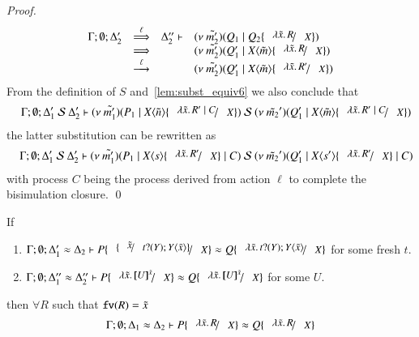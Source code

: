 \begin{proof}
%
\[
	\begin{array}{rcll}
		\Gamma; \es; \Delta_2' &\By{\ell}& \Delta_2'' \proves &
		\newsp{\tilde{m_2'}}{Q_1 \Par Q_2 \subst{\abs{\tilde{x}}{R}}{X}}\\
		&\By{}& &
		\newsp{\tilde{m_2'}}{Q_1' \Par \appl{X}{\tilde{m}} \subst{\abs{\tilde{x}}{R}}{X}} \\
		&\by{\ell}& &
		\newsp{\tilde{m_2'}}{Q_1' \Par \appl{X}{\tilde{m}} \subst{\abs{\tilde{x}}{R'}}{X}} \\
	\end{array}
\]
%
	\noi From the definition of $S$ and~\ref{lem:subst_equiv6}
	we also conclude that
	\begin{eqnarray*}
		&& \horel{\Gamma}
		{\Delta_1'}{\newsp{\tilde{m_1'}}{P_1 \Par \appl{X}{\tilde{n}} \subst{\abs{\tilde{x}}{R' \Par C}}{X}}}
		{\ \mathcal{S}\ }
		{\Delta_2'}{\newsp{\tilde{m_2}'}{Q_1' \Par \appl{X}{\tilde{m}} \subst{\abs{\tilde{x}}{R' \Par C}}{X}}}
	\end{eqnarray*}
%
	\noi the latter substitution can be rewritten as
%
	\begin{eqnarray*}
		&&\horel{\Gamma}
		{\Delta_1'}{\newsp{\tilde{m_1'}}{P_1 \Par \appl{X}{s} \subst{\abs{\tilde{x}}{R'}}{X} \Par C}}
		{\ \mathcal{S}\ }
		{\Delta_2'}{\newsp{\tilde{m_2}'}{Q_1' \Par \appl{X}{s'} \subst{\abs{\tilde{x}}{R'}}{X} \Par C}}
	\end{eqnarray*}
%
	\noi with process $C$ being the process derived from action $\ell$
	to complete the bisimulation closure.
	\qed
\end{proof}



\begin{corollary}\rm
	\label{cor:subst_equiv}
	If 
%
	\begin{enumerate}
		\item	$\horel{\Gamma}{\Delta_1'}{P \subst{\subst{\tilde{x}}{\binp{t}{Y} \appl{Y}{\tilde{x}}}}{X}}{\wb}{\Delta_2}{Q \subst{\abs{\tilde{x}}{\binp{t}{Y} \appl{Y}{\tilde{x}}}}{X}}$
			for some fresh $t$.

		\item	$\horel{\Gamma}{\Delta_1''}{P \subst{\abs{\tilde{x}}{\map{U}^{\tilde{x}}}}{X}}{\wb}{\Delta_2''}{Q \subst{\abs{\tilde{x}}{\map{U}^{\tilde{x}}}}{X}}$
			for some $U$.
	\end{enumerate}
%
	then $\forall R$ such that $\mathtt{fv}(R) = \tilde{x}$
\[
	\horel{\Gamma}{\Delta_1}{P \subst{\abs{\tilde{x}}{R}}{X}}{\wb}{\Delta_2}{Q \subst{\abs{\tilde{x}}{R}}{X}}
\]
\end{corollary}


